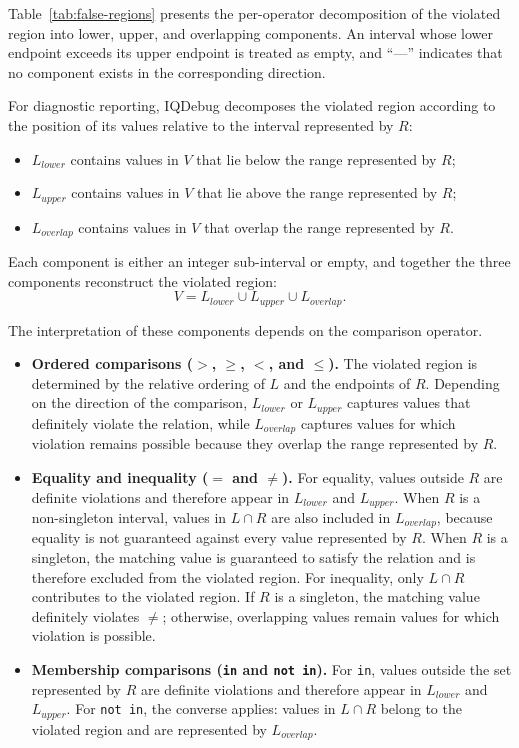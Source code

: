 \documentclass[11pt,oneside]{report}
\theoremstyle{plain}
\theoremstyle{definition}
\theoremstyle{remark}
\begin{document}
Table~\ref{tab:false-regions} presents the per-operator decomposition of the
violated region into lower, upper, and overlapping components.
An interval whose lower endpoint exceeds its upper endpoint is treated as
empty, and ``---'' indicates that no component exists in the corresponding
direction.

For diagnostic reporting, IQDebug decomposes the violated region according to
the position of its values relative to the interval represented by \(R\):
\begin{itemize}
    \item \(L_{\mathit{lower}}\) contains values in \(V\) that lie below the
    range represented by \(R\);
    \item \(L_{\mathit{upper}}\) contains values in \(V\) that lie above the
    range represented by \(R\);
    \item \(L_{\mathit{overlap}}\) contains values in \(V\) that overlap the
    range represented by \(R\).
\end{itemize}

Each component is either an integer sub-interval or empty, and together the
three components reconstruct the violated region:
\[
V
=
L_{\mathit{lower}}
\cup
L_{\mathit{upper}}
\cup
L_{\mathit{overlap}}.
\]

The interpretation of these components depends on the comparison operator.
\begin{itemize}
    \item \textbf{Ordered comparisons (\(>\), \(\geq\), \(<\), and \(\leq\)).}
    The violated region is determined by the relative ordering of \(L\) and
    the endpoints of \(R\).
    Depending on the direction of the comparison,
    \(L_{\mathit{lower}}\) or \(L_{\mathit{upper}}\) captures values that
    definitely violate the relation, while \(L_{\mathit{overlap}}\) captures
    values for which violation remains possible because they overlap the range
    represented by \(R\).
    \item \textbf{Equality and inequality (\(=\) and \(\neq\)).}
    For equality, values outside \(R\) are definite violations and therefore
    appear in \(L_{\mathit{lower}}\) and \(L_{\mathit{upper}}\).
    When \(R\) is a non-singleton interval, values in \(L\cap R\) are also
    included in \(L_{\mathit{overlap}}\), because equality is not guaranteed
    against every value represented by \(R\).
    When \(R\) is a singleton, the matching value is guaranteed to satisfy the
    relation and is therefore excluded from the violated region.
    For inequality, only \(L\cap R\) contributes to the violated region.
    If \(R\) is a singleton, the matching value definitely violates
    \(\neq\); otherwise, overlapping values remain values for which violation
    is possible.
    \item \textbf{Membership comparisons (\texttt{in} and \texttt{not in}).}
    For \texttt{in}, values outside the set represented by \(R\) are definite
    violations and therefore appear in
    \(L_{\mathit{lower}}\) and \(L_{\mathit{upper}}\).
    For \texttt{not in}, the converse applies: values in \(L\cap R\) belong to
    the violated region and are represented by
    \(L_{\mathit{overlap}}\).
\end{itemize}
\end{document}

